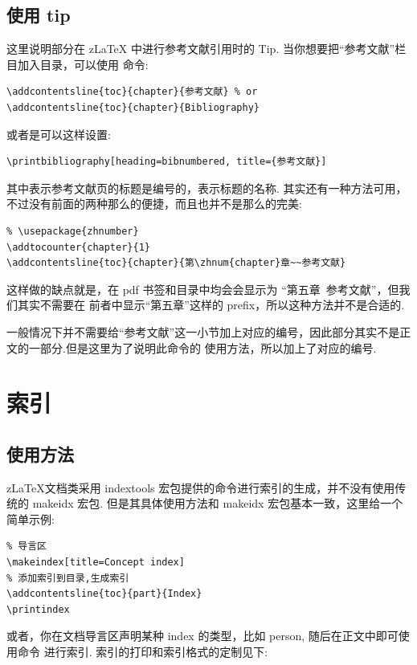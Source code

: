 \subsection{使用 tip}
这里说明部分在 z\LaTeX{} 中进行参考文献引用时的 Tip. 当你想要把``参考文献''栏目加入目录，可以使用
命令:

\begin{verbatim}
\addcontentsline{toc}{chapter}{参考文献} % or
\addcontentsline{toc}{chapter}{Bibliography}
\end{verbatim}

或者是可以这样设置:
\begin{verbatim}
\printbibliography[heading=bibnumbered, title={参考文献}]
\end{verbatim}

其中表示参考文献页的标题是编号的，表示标题的名称.
其实还有一种方法可用，不过没有前面的两种那么的便捷，而且也并不是那么的完美:
\begin{verbatim}
% \usepackage{zhnumber}
\addtocounter{chapter}{1}
\addcontentsline{toc}{chapter}{第\zhnum{chapter}章~~参考文献}
\end{verbatim}

这样做的缺点就是，在 pdf 书签和目录中均会会显示为 ``{第五章\  参考文献}''，但我们其实不需要在
前者中显示``第五章''这样的 prefix，所以这种方法并不是合适的.

\begin{remark}
一般情况下并不需要给``参考文献''这一小节加上对应的编号，因此部分其实不是正文的一部分.但是这里为了说明此命令的
使用方法，所以加上了对应的编号.
\end{remark}



\section{索引}
\subsection{使用方法}
z\LaTeX{}文档类采用 {indextools} 宏包提供的命令进行索引的生成，并不没有使用传统的 {makeidx} 宏包.
但是其具体使用方法和 {makeidx} 宏包基本一致，这里给一个简单示例:

\begin{verbatim}
% 导言区
\makeindex[title=Concept index]
% 添加索引到目录,生成索引
\addcontentsline{toc}{part}{Index}
\printindex
\end{verbatim}

或者，你在文档导言区声明某种 {index} 的类型，比如 {person}, 随后在正文中即可使用命令
 进行索引. 索引的打印和索引格式的定制见下:

